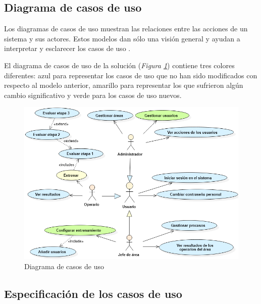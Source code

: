 \subsection{Diagrama de casos de uso}
Los diagramas de casos de uso muestran las relaciones entre las acciones de un sistema y sus actores. Estos modelos dan sólo una visión general y ayudan a interpretar y esclarecer los casos de uso \cite{Kalaivani2004}.

El diagrama de casos de uso de la solución (\textsl{Figura \ref{fig:dcu}}) contiene tres colores diferentes: azul para representar los casos de uso que no han sido modificados con respecto al modelo anterior, amarillo para representar los que sufrieron algún cambio significativo y verde para los casos de uso nuevos.

\begin{figure}[h]
\centering
 \includegraphics[width=0.7\linewidth]{imagen/dcu.png}
 \caption{Diagrama de casos de uso}
 \label{fig:dcu} 
\end{figure}

\subsection{Especificación de los casos de uso}

